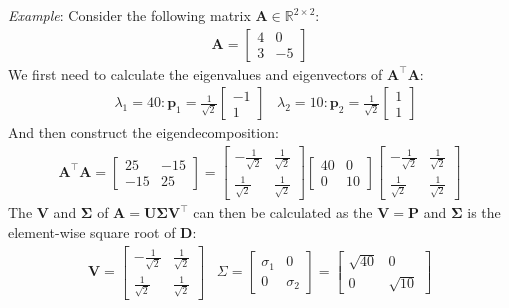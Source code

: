 \documentclass[a4paper,12pt]{article}
\newcommand{\matrx}[1]{\bm{#1}}
\newcommand{\vectr}[1]{\textbf{#1}}
\newcommand{\real}{\mathbb{R}}
\newcommand{\italic}[1]{\textit{#1}}
\begin{document}
	\italic{Example}: Consider the following matrix $ \matrx{A} \in \real^{2 \times 2} $:
	\begin{align}
		\matrx{A} = \begin{bmatrix}
			4 & 0 \\
			3 & -5 
		\end{bmatrix}
	\end{align}
	We first need to calculate the eigenvalues and eigenvectors of $ \matrx{A}^{\top}\matrx{A} $:
	\begin{align}
		\hspace{10pt} \lambda_1 = 40: \vectr{p}_1 = \frac{1}{\sqrt{2}} \begin{bmatrix}
			-1 \\ 1
		\end{bmatrix}  \hspace{10pt} \lambda_2 = 10: \vectr{p}_2 = \frac{1}{\sqrt{2}} \begin{bmatrix}
			1 \\ 1
		\end{bmatrix}
	\end{align} 
	And then construct the eigendecomposition:
	\begin{align}
		\matrx{A}^{\top} \matrx{A} = \begin{bmatrix}
			25 & -15 \\
			-15 & 25 
		\end{bmatrix} = \begin{bmatrix}
			-\frac{1}{\sqrt{2}} & \frac{1}{\sqrt{2}} \\
			\frac{1}{\sqrt{2}} & \frac{1}{\sqrt{2}}
		\end{bmatrix} \begin{bmatrix}
			40 & 0 \\
			0 & 10
		\end{bmatrix} \begin{bmatrix}
			-\frac{1}{\sqrt{2}} & \frac{1}{\sqrt{2}} \\
			\frac{1}{\sqrt{2}} & \frac{1}{\sqrt{2}}
		\end{bmatrix}
	\end{align}
	The $ \matrx{V} $ and $ \matrx{\Sigma} $ of $ \matrx{A} = \matrx{U} \matrx{\Sigma} \matrx{V}^{\top} $ can then be calculated as the $ \matrx{V} = \matrx{P} $ and $ \matrx{\Sigma} $ is the element-wise square root of $ \matrx{D} $: 
	\begin{align}
		\matrx{V} = \begin{bmatrix}
			-\frac{1}{\sqrt{2}} & \frac{1}{\sqrt{2}} \\
			\frac{1}{\sqrt{2}} & \frac{1}{\sqrt{2}}
		\end{bmatrix}  \hspace{10pt} \Sigma = \begin{bmatrix}
			\sigma_1 & 0 \\
			0 & \sigma_2
		\end{bmatrix} = \begin{bmatrix}
			\sqrt{40} & 0 \\
			0 & \sqrt{10}
		\end{bmatrix}
	\end{align}
\end{document}
